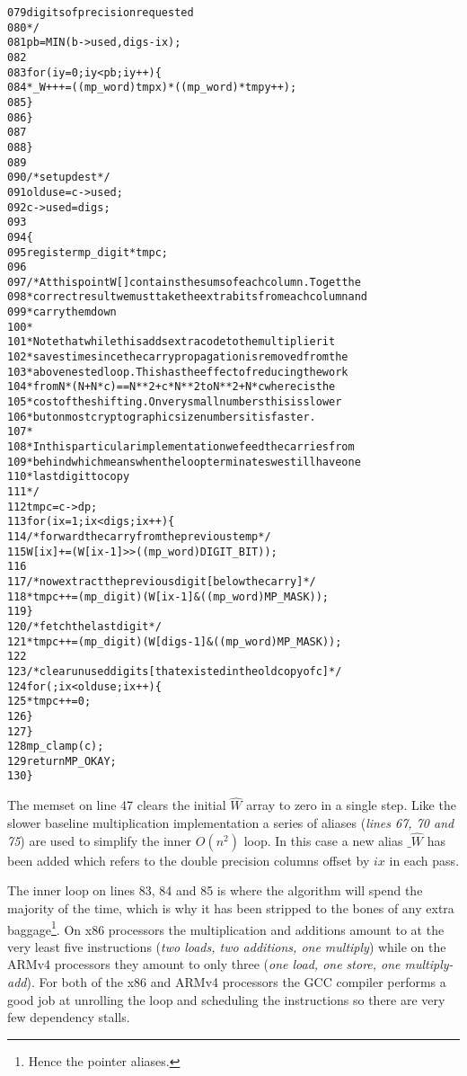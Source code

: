 \documentclass[b5paper]{book}
\begin{document}
\begin{small}
\begin{alltt}
079            digits of precision requested
080          */
081         pb = MIN (b->used, digs - ix);
082   
083         for (iy = 0; iy < pb; iy++) \{
084           *_W++ += ((mp_word)tmpx) * ((mp_word)*tmpy++);
085         \}
086       \}
087   
088     \}
089   
090     /* setup dest */
091     olduse = c->used;
092     c->used = digs;
093   
094     \{
095       register mp_digit *tmpc;
096   
097       /* At this point W[] contains the sums of each column.  To get the
098        * correct result we must take the extra bits from each column and
099        * carry them down
100        *
101        * Note that while this adds extra code to the multiplier it 
102        * saves time since the carry propagation is removed from the 
103        * above nested loop.This has the effect of reducing the work 
104        * from N*(N+N*c)==N**2 + c*N**2 to N**2 + N*c where c is the 
105        * cost of the shifting.  On very small numbers this is slower 
106        * but on most cryptographic size numbers it is faster.
107        *
108        * In this particular implementation we feed the carries from
109        * behind which means when the loop terminates we still have one
110        * last digit to copy
111        */
112       tmpc = c->dp;
113       for (ix = 1; ix < digs; ix++) \{
114         /* forward the carry from the previous temp */
115         W[ix] += (W[ix - 1] >> ((mp_word) DIGIT_BIT));
116   
117         /* now extract the previous digit [below the carry] */
118         *tmpc++ = (mp_digit) (W[ix - 1] & ((mp_word) MP_MASK));
119       \}
120       /* fetch the last digit */
121       *tmpc++ = (mp_digit) (W[digs - 1] & ((mp_word) MP_MASK));
122   
123       /* clear unused digits [that existed in the old copy of c] */
124       for (; ix < olduse; ix++) \{
125         *tmpc++ = 0;
126       \}
127     \}
128     mp_clamp (c);
129     return MP_OKAY;
130   \}
\end{alltt}
\end{small}

The memset on line 47 clears the initial $\hat W$ array to zero in a single step. Like the slower baseline multiplication
implementation a series of aliases (\textit{lines 67, 70 and 75}) are used to simplify the inner $O(n^2)$ loop.  
In this case a new alias $\_\hat W$ has been added which refers to the double precision columns offset by $ix$ in each pass.  

The inner loop on lines 83, 84 and 85 is where the algorithm will spend the majority of the time, which is why it has been 
stripped to the bones of any extra baggage\footnote{Hence the pointer aliases.}.  On x86 processors the multiplication and additions amount to at the 
very least five instructions (\textit{two loads, two additions, one multiply}) while on the ARMv4 processors they amount to only three 
(\textit{one load, one store, one multiply-add}).   For both of the x86 and ARMv4 processors the GCC compiler performs a good job at unrolling the loop 
and scheduling the instructions so there are very few dependency stalls.
\end{document}
